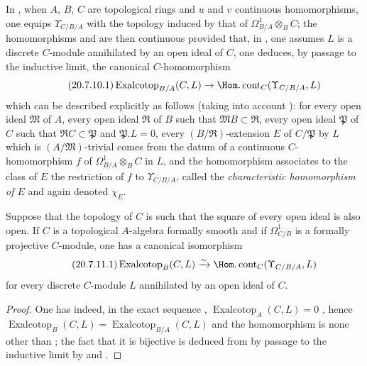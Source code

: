 \begin{env}[20.7.10]
\label{0.20.7.10}
In , when $A$, $B$, $C$ are topological rings and $u$ and $v$ continuous homomorphisms, one equips $\Upsilon_{C/B/A}$ with the topology induced by that of $\Omega^1_{B/A}\otimes_B C$; the homomorphisms  and  are then continuous provided that, in , one assumes $L$ is a discrete $C$-module annihilated by an open ideal of $C$, one deduces, by passage to the inductive limit, the canonical $C$-homomorphism
\begin{equation}
\tag{20.7.10.1}
  \label{0.20.7.10.1}
  \operatorname{Exalcotop}_{B/A}(C,L)\to\Hom.\operatorname{cont}_C(\Upsilon_{C/B/A},L)
\end{equation}
which can be described explicitly as follows (taking into account ): for every open ideal $\mathfrak{M}$ of $A$, every open ideal $\mathfrak{R}$ of $B$ such that $\mathfrak{M}B\subset\mathfrak{R}$, every open ideal $\mathfrak{P}$ of $C$ such that $\mathfrak{R}C\subset\mathfrak{P}$ and $\mathfrak{P}.L=0$, every $(B/\mathfrak{R})$-extension $E$ of $C/\mathfrak{P}$ by $L$ which is $(A/\mathfrak{M})$-trivial comes from the datum of a continuous $C$-homomorphism $f$ of $\Omega^1_{B/A}\otimes_B C$ in $L$, and the homomorphism  associates to the class of $E$ the restriction of $f$ to $\Upsilon_{C/B/A}$, called the \emph{characteristic homomorphism of $E$} and again denoted $\chi_E$.
\end{env}

\begin{proposition}[20.7.11]
\label{0.20.7.11}
Suppose that the topology of $C$ is such that the square of every open ideal is also open.
If $C$ is a topological $A$-algebra formally smooth and if $\Omega^1_{C/B}$ is a formally projective $C$-module, one has a canonical isomorphism
\begin{equation}
\tag{20.7.11.1}
  \label{0.20.7.11.1}
  \operatorname{Exalcotop}_B(C,L)\xrightarrow{\sim}\Hom.\operatorname{cont}_C(\Upsilon_{C/B/A},L)
\end{equation}
for every discrete $C$-module $L$ annihilated by an open ideal of $C$.
\end{proposition}

\begin{proof}
One has indeed, in the exact sequence , $\operatorname{Exalcotop}_A(C,L)=0$ , hence $\operatorname{Exalcotop}_B(C,L)=\operatorname{Exalcotop}_{B/A}(C,L)$ and the homomorphism  is none other than ; the fact that it is bijective is deduced from  by passage to the inductive limit by  and .
\end{proof}


